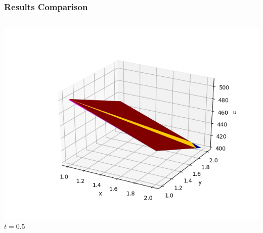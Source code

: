 \documentclass[]{beamer}
\begin{document}
\begin{frame}[t]\frametitle{Results Comparison}
  	\begin{columns}
			\begin{center}
			\includegraphics[scale=0.2]{figures/2D_rz_ls1mat_u_vs_x_05}\\
			\tiny$t=0.5$
			
			\null
			

\end{center}
\end{columns}
\end{frame}
\end{document}
